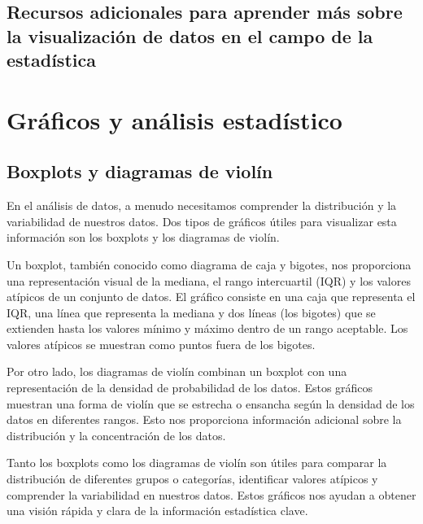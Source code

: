 \documentclass[
  a4paper,
]{article}
\begin{document}
\hypertarget{recursos-adicionales-para-aprender-muxe1s-sobre-la-visualizaciuxf3n-de-datos-en-el-campo-de-la-estaduxedstica}{%
\subsection{Recursos adicionales para aprender más sobre la
visualización de datos en el campo de la
estadística}\label{recursos-adicionales-para-aprender-muxe1s-sobre-la-visualizaciuxf3n-de-datos-en-el-campo-de-la-estaduxedstica}}

\hypertarget{gruxe1ficos-y-anuxe1lisis-estaduxedstico}{%
\section{Gráficos y análisis
estadístico}\label{gruxe1ficos-y-anuxe1lisis-estaduxedstico}}

\hypertarget{boxplots-y-diagramas-de-violuxedn}{%
\subsection{Boxplots y diagramas de
violín}\label{boxplots-y-diagramas-de-violuxedn}}

En el análisis de datos, a menudo necesitamos comprender la distribución
y la variabilidad de nuestros datos. Dos tipos de gráficos útiles para
visualizar esta información son los boxplots y los diagramas de violín.

Un boxplot, también conocido como diagrama de caja y bigotes, nos
proporciona una representación visual de la mediana, el rango
intercuartil (IQR) y los valores atípicos de un conjunto de datos. El
gráfico consiste en una caja que representa el IQR, una línea que
representa la mediana y dos líneas (los bigotes) que se extienden hasta
los valores mínimo y máximo dentro de un rango aceptable. Los valores
atípicos se muestran como puntos fuera de los bigotes.

Por otro lado, los diagramas de violín combinan un boxplot con una
representación de la densidad de probabilidad de los datos. Estos
gráficos muestran una forma de violín que se estrecha o ensancha según
la densidad de los datos en diferentes rangos. Esto nos proporciona
información adicional sobre la distribución y la concentración de los
datos.

Tanto los boxplots como los diagramas de violín son útiles para comparar
la distribución de diferentes grupos o categorías, identificar valores
atípicos y comprender la variabilidad en nuestros datos. Estos gráficos
nos ayudan a obtener una visión rápida y clara de la información
estadística clave.
\end{document}

